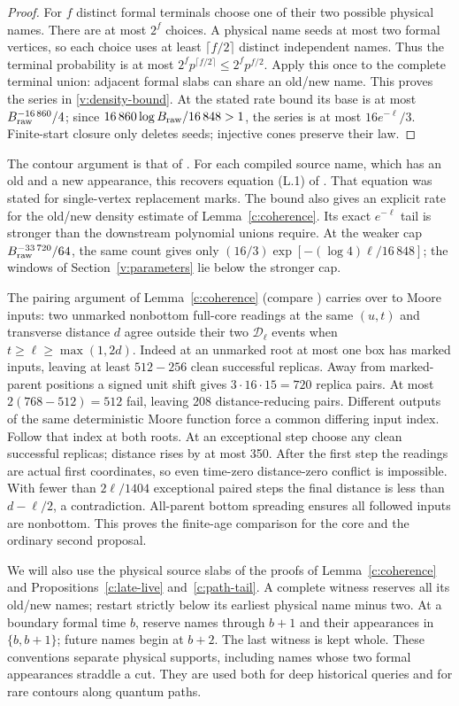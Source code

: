 \begin{proof}
For \(f\) distinct formal terminals choose one of their two possible
physical names. There are at most \(2^f\) choices. A physical name seeds
at most two formal vertices, so each choice uses at least
\(\lceil f/2\rceil\) distinct independent names. Thus the terminal
probability is at most \(2^fp^{\lceil f/2\rceil}\le2^fp^{f/2}\).
Apply this once to the complete terminal union: adjacent formal slabs
can share an old/new name. This proves the series in
\eqref{v:density-bound}. At the stated rate bound its base is at most
\(B_{\rm raw}^{-16\,860}/4\); since
\(16\,860\log B_{\rm raw}/16\,848>1\), the series is at most
\(16e^{-\ell}/3\). Finite-start closure only deletes seeds; injective
cones preserve their law.
\end{proof}

The contour argument is that of \cite[Lemmas~12.3 and~12.4]{DMFixed2026}.
For each compiled source name, which has an old and a new appearance, this recovers equation (L.1) of \cite[Section~10.2]{DMNoise2026}. That equation was stated for single-vertex replacement marks. The bound also gives an explicit rate for the old/new density estimate of Lemma~\ref{c:coherence}. Its exact \(e^{-\ell}\) tail is stronger
than the downstream polynomial unions require. At the weaker cap
\(B_{\rm raw}^{-33\,720}/64\), the same count gives only
\((16/3)\exp[-(\log4)\ell/16\,848]\); the windows of Section~\ref{v:parameters} lie below the stronger cap.

The pairing argument of Lemma~\ref{c:coherence} (compare
\cite[Lemma~10.2]{DMNoise2026}) carries over to Moore inputs: two
unmarked nonbottom full-core readings at the same \((u,t)\) and
transverse distance \(d\) agree outside their two \(\mathcal D_\ell\)
events when \(t\ge\ell\ge\max(1,2d)\). Indeed at an unmarked root at
most one box has marked inputs, leaving at least \(512-256\) clean
successful replicas. Away from marked-parent positions a signed unit
shift gives \(3\cdot16\cdot15=720\) replica pairs. At most
\(2(768-512)=512\) fail, leaving 208 distance-reducing pairs.
Different outputs of the same deterministic Moore function force a
common differing input index. Follow that index at both roots. At an
exceptional step choose any clean successful replicas; distance rises
by at most 350. After the first step the readings are actual first
coordinates, so even time-zero distance-zero conflict is impossible.
With fewer than \(2\ell/1404\) exceptional paired steps the final
distance is less than \(d-\ell/2\), a contradiction. All-parent bottom
spreading ensures all followed inputs are nonbottom. This proves the
finite-age comparison for the core and the ordinary second proposal.

We will also use the physical source slabs of the proofs of
Lemma~\ref{c:coherence} and Propositions~\ref{c:late-live}
and~\ref{c:path-tail}. A complete witness reserves
all its old/new names; restart strictly below its earliest physical
name minus two. At a boundary formal time \(b\), reserve names through
\(b+1\) and their appearances in \(\{b,b+1\}\); future names begin at
\(b+2\). The last witness is kept whole. These conventions separate
physical supports, including names whose two formal appearances straddle
a cut. They are used both for deep historical queries and for rare
contours along quantum paths.
